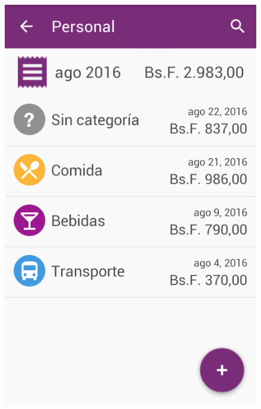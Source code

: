\begin{figure}[ht]
\centering
\begin{minipage}{.5\textwidth}
  \centering
  \includegraphics[scale=0.4,type=png,ext=.png,read=.png]{imagenes/expenses_list}
  \captionsetup{justification=centering}
  \label{fig:interfazListarExpenses}
\end{minipage}%
\begin{minipage}{.5\textwidth}
\centering

\end{minipage}
\end{figure}
